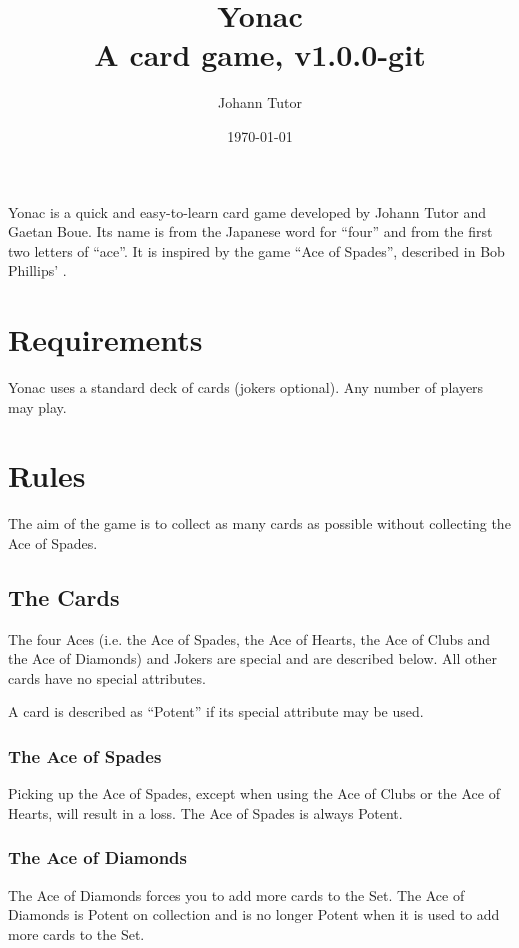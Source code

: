 \documentclass{article}
\newcommand\theversion{1.0.0-git}
\begin{document}
\title{Yonac\\ \large A card game, v\theversion}
\author{Johann Tutor}
\date{\today}
\maketitle

Yonac is a quick and easy-to-learn card game developed by Johann Tutor
and Gaetan Boue. Its name is from the Japanese word for ``four'' and
from the first two letters of ``ace''. It is inspired by the game ``Ace
of Spades'', described in Bob Phillips'
.

\tableofcontents

\newpage

\section{Requirements}

Yonac uses a standard deck of cards (jokers optional). Any number of
players may play.

\section{Rules}

The aim of the game is to collect as many cards as possible without
collecting the Ace of Spades.

\subsection{The Cards}
\label{sec:cards}

The four Aces (i.e. the Ace of Spades, the Ace of Hearts, the Ace of Clubs and
the Ace of Diamonds) and Jokers are special and are described below. All other
cards have no special attributes.

A card is described as ``Potent'' if its special attribute may be used.

\subsubsection{The Ace of Spades}
Picking up the Ace of Spades, except when using the Ace of Clubs or the
Ace of Hearts, will result in a loss. The Ace of Spades is always Potent.

\subsubsection{The Ace of Diamonds}
The Ace of Diamonds forces you to add more cards to the Set. The Ace of
Diamonds is Potent on collection and is no longer Potent when it is used
to add more cards to the Set.
\end{document}
